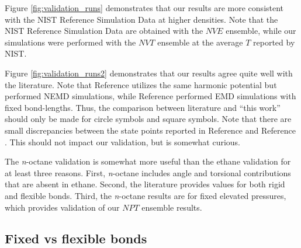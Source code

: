 \documentclass[preprint,review,12pt]{elsarticle}
\begin{document}
    Figure \ref{fig:validation_runs} demonstrates that our results are more consistent with the NIST Reference Simulation Data at higher densities. Note that the NIST Reference Simulation Data are obtained with the $NVE$ ensemble, while our simulations were performed with the $NVT$ ensemble at the average $T$ reported by NIST. 
    
    Figure \ref{fig:validation_runs2} demonstrates that our results agree quite well with the literature. Note that Reference  utilizes the same harmonic potential but performed NEMD simulations, while Reference  performed EMD simulations with fixed bond-lengths. Thus, the comparison between literature and ``this work'' should only be made for circle symbols and square symbols.  Note that there are small discrepancies between the state points reported in Reference  and Reference . This should not impact our validation, but is somewhat curious. 
    
    The \textit{n}-octane validation is somewhat more useful than the ethane validation for at least three reasons. First, \textit{n}-octane includes angle and torsional contributions that are absent in ethane. Second, the literature provides values for both rigid and flexible bonds. Third, the \textit{n}-octane results are for fixed elevated pressures, which provides validation of our $NPT$ ensemble results.
    
%	
	
	\subsection{Fixed vs flexible bonds} \label{fixed flexbile}
	
	
\end{document}
